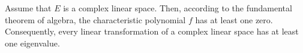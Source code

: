Assume that $E$ is a complex linear space. Then, according to the fundamental theorem of algebra, the characteristic polynomial $f$ has at least one zero. Consequently, every linear transformation of a complex linear space has at least one eigenvalue.
